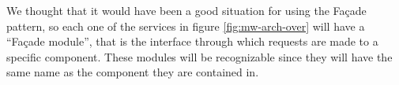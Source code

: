We thought that it would have been a good situation for using the Fa\c cade
pattern, so each one of the services in figure \ref{fig:mw-arch-over} will have
a ``Fa\c cade module'', that is the interface through which requests are made
to a specific component.
These modules will be recognizable since they will have the same name as the
component they are contained in.








